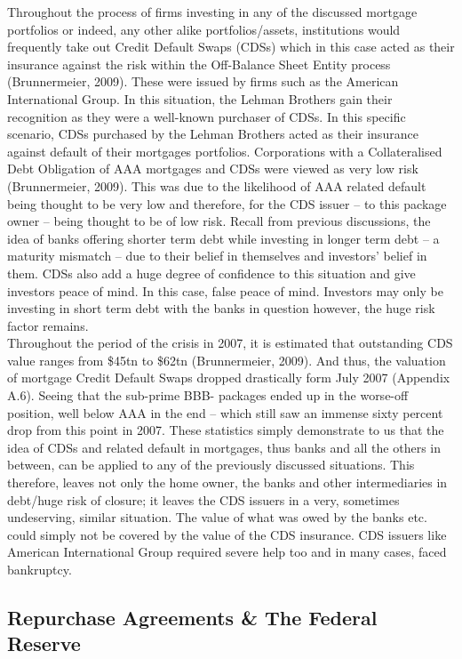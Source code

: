 \documentclass[11pt, english]{article}
\begin{document}
	Throughout the process of firms investing in any of the discussed mortgage portfolios or indeed, any other alike portfolios/assets, institutions would frequently take out Credit Default Swaps (CDSs) which in this case acted as their insurance against the risk within the Off-Balance Sheet Entity process (Brunnermeier, 2009). These were issued by firms such as the American International Group. In this situation, the Lehman Brothers gain their recognition as they were a well-known purchaser of CDSs. In this specific scenario, CDSs purchased by the Lehman Brothers acted as their insurance against default of their mortgages portfolios. Corporations with a Collateralised Debt Obligation of AAA mortgages and CDSs were viewed as very low risk (Brunnermeier, 2009). This was due to the likelihood of AAA related default being thought to be very low and therefore, for the CDS issuer – to this package owner – being thought to be of low risk. Recall from previous discussions, the idea of banks offering shorter term debt while investing in longer term debt – a maturity mismatch – due to their belief in themselves and investors' belief in them. CDSs also add a huge degree of confidence to this situation and give investors peace of mind. In this case, false peace of mind. Investors may only be investing in short term debt with the banks in question however, the huge risk factor remains.\\

	Throughout the period of the crisis in 2007, it is estimated that outstanding CDS value ranges from \$45tn to \$62tn (Brunnermeier, 2009). And thus, the valuation of mortgage Credit Default Swaps dropped drastically form July 2007 (Appendix A.6). Seeing that the sub-prime BBB- packages ended up in the worse-off position, well below AAA in the end – which still saw an immense sixty percent drop from this point in 2007. These statistics simply demonstrate to us that the idea of CDSs and related default in mortgages, thus banks and all the others in between, can be applied to any of the previously discussed situations. This therefore, leaves not only the home owner, the banks and other intermediaries in debt/huge risk of closure; it leaves the CDS issuers in a very, sometimes undeserving, similar situation. The value of what was owed by the banks etc. could simply not be covered by the value of the CDS insurance. CDS issuers like American International Group required severe help too and in many cases, faced bankruptcy.

	\subsection{Repurchase Agreements \& The Federal Reserve}
\end{document}
